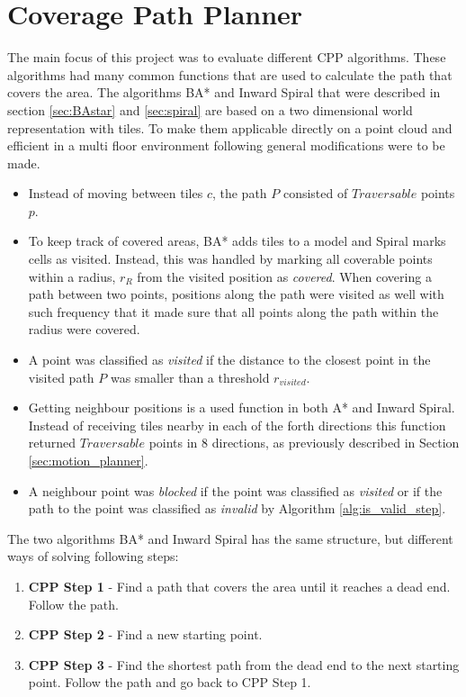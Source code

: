 \section{Coverage Path Planner}
\label{sec:general_cpp}
The main focus of this project was to evaluate different CPP algorithms. These algorithms had many common functions that are used to calculate the path that covers the area. The algorithms BA* and Inward Spiral that were described in section \ref{sec:BAstar} and \ref{sec:spiral} are based on a two dimensional world representation with tiles. To make them applicable directly on a point cloud and efficient in a multi floor environment following general modifications were to be made.

\begin{itemize}
    \item Instead of moving between tiles $c$, the path $P$ consisted of $Traversable$ points $p$.
    \item To keep track of covered areas, BA* adds tiles to a model and Spiral marks cells as visited. Instead, this was handled by marking all coverable points within a radius, $r_R$ from the visited position as \emph{covered}. When covering a path between two points, positions along the path were visited as well with such frequency that it made sure that all points along the path within the radius were covered.
    \item A point was classified as \emph{visited} if the distance to the closest point in the visited path $P$ was smaller than a threshold $r_{visited}$.
    \item Getting neighbour positions is a used function in both A* and Inward Spiral. Instead of receiving tiles nearby in each of the forth directions this function returned $Traversable$ points in 8 directions, as previously described in Section \ref{sec:motion_planner}.
    \item A neighbour point was \emph{blocked} if the point was classified as \emph{visited} or if the path to the point was classified as \emph{invalid} by Algorithm \ref{alg:is_valid_step}.
\end{itemize}

The two algorithms BA* and Inward Spiral has the same structure, but different ways of solving following steps:
\begin{enumerate}
    \item \textbf{CPP Step 1} - Find a path that covers the area until it reaches a dead end. Follow the path.
    \item \textbf{CPP Step 2} - Find a new starting point.
    \item \textbf{CPP Step 3} - Find the shortest path from the dead end to the next starting point. Follow the path and go back to CPP Step 1.
\end{enumerate}

